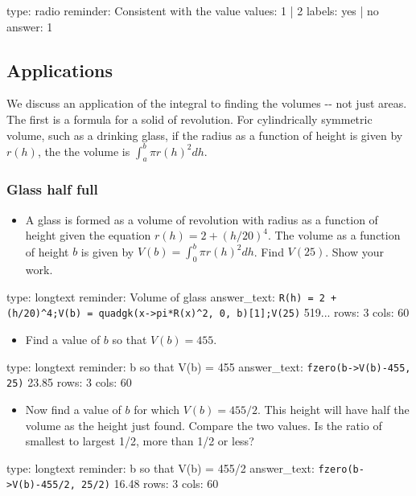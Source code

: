 \documentclass[12pt]{article}
\begin{document}
\begin{answer}
type: radio
reminder: Consistent with the value
values: 1 | 2
labels: yes | no
answer: 1
\end{answer}

\subsection{Applications}

We discuss an application of the integral to finding the volumes -{}-
not just areas. The first is a formula for a solid of revolution. For
cylindrically symmetric volume, such as a drinking glass, if the radius
as a function of height is given by $r(h)$, the the volume is
$\int_a^b \pi r(h)^2 dh$.

\subsubsection{Glass half full}

\begin{itemize}
\itemsep1pt\parskip0pt
\item
  A glass is formed as a volume of revolution with radius as a function
  of height given the equation $r(h) = 2 + (h/20)^4$. The volume as a
  function of height $b$ is given by $V(b) = \int_0^b \pi   r(h)^2 dh$.
  Find $V(25)$. Show your work.
\end{itemize}

\begin{answer}
type: longtext
reminder: Volume of glass
answer_text: \verb#R(h) = 2 + (h/20)^4;V(b) = quadgk(x->pi*R(x)^2, 0, b)[1];V(25)# 519... 
rows: 3
cols: 60
\end{answer}

\begin{itemize}
\itemsep1pt\parskip0pt
\item
  Find a value of $b$ so that $V(b) = 455$.
\end{itemize}

\begin{answer}
type: longtext
reminder: b so that V(b) = 455
answer_text: \verb#fzero(b->V(b)-455, 25)# 23.85 
rows: 3
cols: 60
\end{answer}

\begin{itemize}
\itemsep1pt\parskip0pt
\item
  Now find a value of $b$ for which $V(b) = 455/2$. This height will
  have half the volume as the height just found. Compare the two values.
  Is the ratio of smallest to largest 1/2, more than 1/2 or less?
\end{itemize}

\begin{answer}
type: longtext
reminder: b so that V(b) = 455/2
answer_text: \verb#fzero(b->V(b)-455/2, 25/2)# 16.48 
rows: 3
cols: 60
\end{answer}
\end{document}
